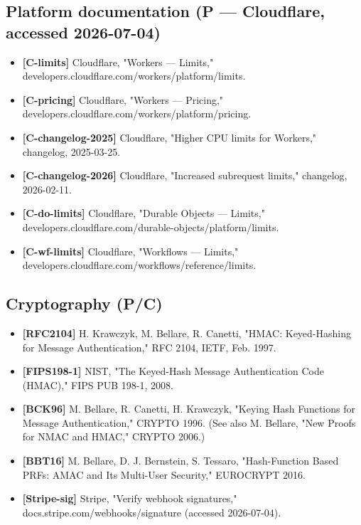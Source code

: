 \subsection{Platform documentation (P --- Cloudflare, accessed
2026-07-04)}\label{platform-documentation-p--cloudflare-accessed-2026-07-04}

\begin{itemize}
\tightlist
\item
  \textbf{{[}C-limits{]}} Cloudflare, "Workers --- Limits,"
  developers.cloudflare.com/workers/platform/limits.
\item
  \textbf{{[}C-pricing{]}} Cloudflare, "Workers --- Pricing,"
  developers.cloudflare.com/workers/platform/pricing.
\item
  \textbf{{[}C-changelog-2025{]}} Cloudflare, "Higher CPU limits for
  Workers," changelog, 2025-03-25.
\item
  \textbf{{[}C-changelog-2026{]}} Cloudflare, "Increased subrequest
  limits," changelog, 2026-02-11.
\item
  \textbf{{[}C-do-limits{]}} Cloudflare, "Durable Objects --- Limits,"
  developers.cloudflare.com/durable-objects/platform/limits.
\item
  \textbf{{[}C-wf-limits{]}} Cloudflare, "Workflows --- Limits,"
  developers.cloudflare.com/workflows/reference/limits.
\end{itemize}

\subsection{Cryptography (P/C)}\label{cryptography-pc}

\begin{itemize}
\tightlist
\item
  \textbf{{[}RFC2104{]}} H. Krawczyk, M. Bellare, R. Canetti, "HMAC:
  Keyed-Hashing for Message Authentication," RFC 2104, IETF, Feb. 1997.
\item
  \textbf{{[}FIPS198-1{]}} NIST, "The Keyed-Hash Message Authentication
  Code (HMAC)," FIPS PUB 198-1, 2008.
\item
  \textbf{{[}BCK96{]}} M. Bellare, R. Canetti, H. Krawczyk, "Keying Hash
  Functions for Message Authentication," CRYPTO 1996. (See also M.
  Bellare, "New Proofs for NMAC and HMAC," CRYPTO 2006.)
\item
  \textbf{{[}BBT16{]}} M. Bellare, D. J. Bernstein, S. Tessaro,
  "Hash-Function Based PRFs: AMAC and Its Multi-User Security,"
  EUROCRYPT 2016.
\item
  \textbf{{[}Stripe-sig{]}} Stripe, "Verify webhook signatures,"
  docs.stripe.com/webhooks/signature (accessed 2026-07-04).
\end{itemize}

